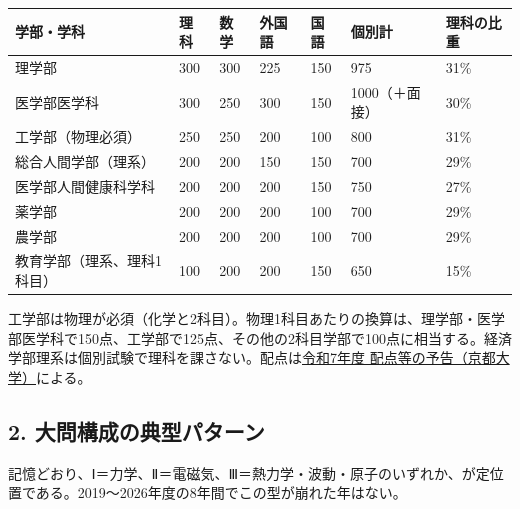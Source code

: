 \documentclass[
  10pt,
  a4paper,
]{article}
\begin{document}
\begin{longtable}[]{@{}lllllll@{}}
\toprule\noalign{}
学部・学科 & 理科 & 数学 & 外国語 & 国語 & 個別計 & 理科の比重 \\
\midrule\noalign{}
\endhead
\bottomrule\noalign{}
\endlastfoot
理学部 & 300 & 300 & 225 & 150 & 975 & 31\% \\
医学部医学科 & 300 & 250 & 300 & 150 & 1000（＋面接） & 30\% \\
工学部（物理必須） & 250 & 250 & 200 & 100 & 800 & 31\% \\
総合人間学部（理系） & 200 & 200 & 150 & 150 & 700 & 29\% \\
医学部人間健康科学科 & 200 & 200 & 200 & 150 & 750 & 27\% \\
薬学部 & 200 & 200 & 200 & 100 & 700 & 29\% \\
農学部 & 200 & 200 & 200 & 100 & 700 & 29\% \\
教育学部（理系、理科1科目） & 100 & 200 & 200 & 150 & 650 & 15\% \\
\end{longtable}

工学部は物理が必須（化学と2科目）。物理1科目あたりの換算は、理学部・医学部医学科で150点、工学部で125点、その他の2科目学部で100点に相当する。経済学部理系は個別試験で理科を課さない。配点は\href{https://www.kyoto-u.ac.jp/sites/default/files/inline-files/r7-ippan-haiten.20230720-fef9e3eeb820f21604ccbd19081ff0fe.pdf}{令和7年度
配点等の予告（京都大学）}による。

\hypertarget{ux5927ux554fux69cbux6210ux306eux5178ux578bux30d1ux30bfux30fcux30f3}{%
\subsection{2.
大問構成の典型パターン}\label{ux5927ux554fux69cbux6210ux306eux5178ux578bux30d1ux30bfux30fcux30f3}}

記憶どおり、Ⅰ＝力学、Ⅱ＝電磁気、Ⅲ＝熱力学・波動・原子のいずれか、が定位置である。2019〜2026年度の8年間でこの型が崩れた年はない。
\end{document}
